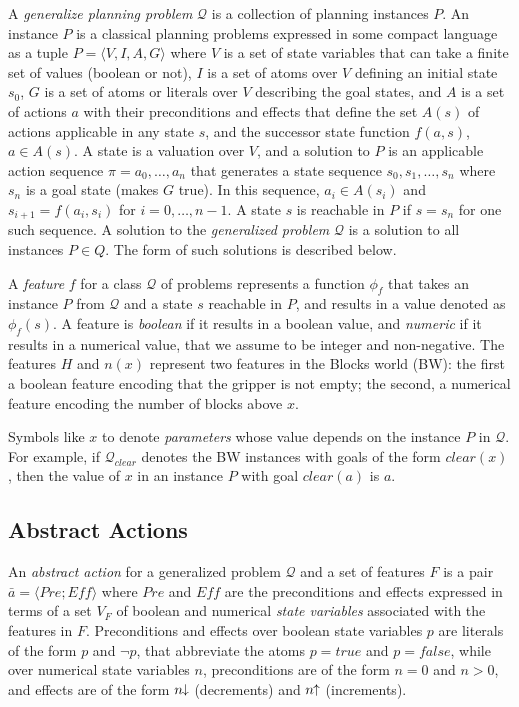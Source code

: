 \documentclass[letterpaper]{article} %
\newcommand{\tup}[1]{\langle #1 \rangle}
\newcommand{\Q}{\mathcal{Q}}
\newcommand{\Eff}{{\mathit{Eff}}}
\newcommand{\abst}[2]{\tup{#1;#2}}
\newcommand{\pplus}{\hspace{-.05em}\raisebox{.15ex}{\footnotesize$\uparrow$}}
\newcommand{\mminus}{\hspace{-.05em}\raisebox{.15ex}{\footnotesize$\downarrow$}}
\begin{document}
A \emph{generalize planning problem} $\Q$ is a collection of planning instances $P$.
An instance $P$ is a  classical planning problems expressed in some compact language as a
tuple $P=\tup{V,I,A,G}$ where $V$ is a set of state variables that can take a finite set of values (boolean or not), $I$
is a set of atoms over $V$ defining an initial state $s_0$, $G$ is a set of atoms or literals over $V$ describing the goal states,
and $A$ is a set of actions $a$ with their preconditions and effects that define the set $A(s)$ of actions applicable
in any state $s$, and the successor state function $f(a,s)$, $a \in A(s)$. A state is a valuation over $V$, and a solution to
$P$ is an applicable action sequence $\pi=a_0,\ldots,a_n$ that generates  a state sequence $s_0,s_1,\ldots,s_{n}$
where $s_n$ is a goal state (makes $G$ true). In this sequence, $a_i \in A(s_i)$ and $s_{i+1}=f(a_i,s_i)$ for $i=0, \ldots, n-1$.
A state $s$ is reachable in $P$ if $s=s_n$ for one such sequence. A solution to the \emph{generalized problem} $\Q$ is
a solution to all instances $P \in Q$. The form of such solutions is described  below.

A \emph{feature} $f$ for a class $\Q$ of problems represents a function $\phi_f$
that takes an instance $P$ from $\Q$ and a state $s$ reachable in $P$, 
and results in a value denoted as $\phi_f(s)$. 
A feature is \emph{boolean}  if it results in a boolean value, and  \emph{numeric} if it results
in a numerical value, that we assume to be integer and non-negative. The features $H$
and $n(x)$ represent two features in the Blocks world (BW): the first a boolean
feature encoding that   the gripper is not empty; the second, a numerical
feature encoding  the number of blocks above  $x$. 

Symbols like $x$ to denote \emph{parameters} whose value depends on the instance  $P$ in  $\Q$.
For example, if $\Q_{clear}$  denotes  the BW instances with goals of the form $clear(x)$,
then the value of $x$ in an instance $P$ with goal $clear(a)$ is  $a$.

\subsection{Abstract Actions}

An \emph{abstract action}  for a generalized problem $\Q$ and a set of features $F$
is a pair $\bar{a}=\abst{Pre}{\Eff}$ where $Pre$ and $\Eff$ are the  preconditions
and effects expressed in terms of a  set $V_F$ of boolean and numerical \emph{state variables}
associated with the features in $F$. Preconditions and effects over boolean state variables $p$ are literals of the form $p$
and $\neg p$, that abbreviate the  atoms $p=true$ and $p=false$, while  over  numerical state variables $n$,
preconditions are of  the form $n=0$ and $n > 0$, and effects are  of the form $n\mminus$ (decrements) and
$n\pplus$ (increments).
\end{document}
